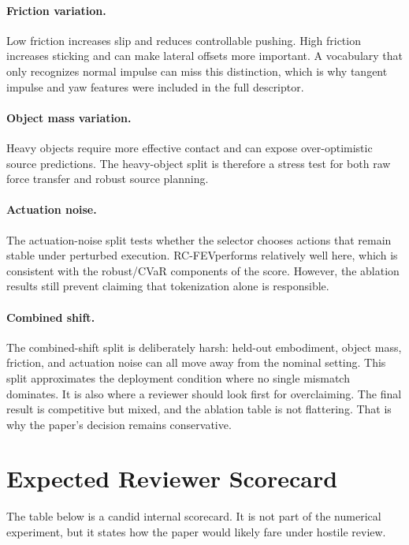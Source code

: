 \documentclass{article}
\newcommand{\method}{RC-FEV}
\begin{document}
\paragraph{Friction variation.}
Low friction increases slip and reduces controllable pushing. High friction increases sticking and can make lateral offsets more important. A vocabulary that only recognizes normal impulse can miss this distinction, which is why tangent impulse and yaw features were included in the full descriptor.

\paragraph{Object mass variation.}
Heavy objects require more effective contact and can expose over-optimistic source predictions. The heavy-object split is therefore a stress test for both raw force transfer and robust source planning.

\paragraph{Actuation noise.}
The actuation-noise split tests whether the selector chooses actions that remain stable under perturbed execution. \method performs relatively well here, which is consistent with the robust/CVaR components of the score. However, the ablation results still prevent claiming that tokenization alone is responsible.

\paragraph{Combined shift.}
The combined-shift split is deliberately harsh: held-out embodiment, object mass, friction, and actuation noise can all move away from the nominal setting. This split approximates the deployment condition where no single mismatch dominates. It is also where a reviewer should look first for overclaiming. The final result is competitive but mixed, and the ablation table is not flattering. That is why the paper's decision remains conservative.

\section{Expected Reviewer Scorecard}

The table below is a candid internal scorecard. It is not part of the numerical experiment, but it states how the paper would likely fare under hostile review.
\end{document}

